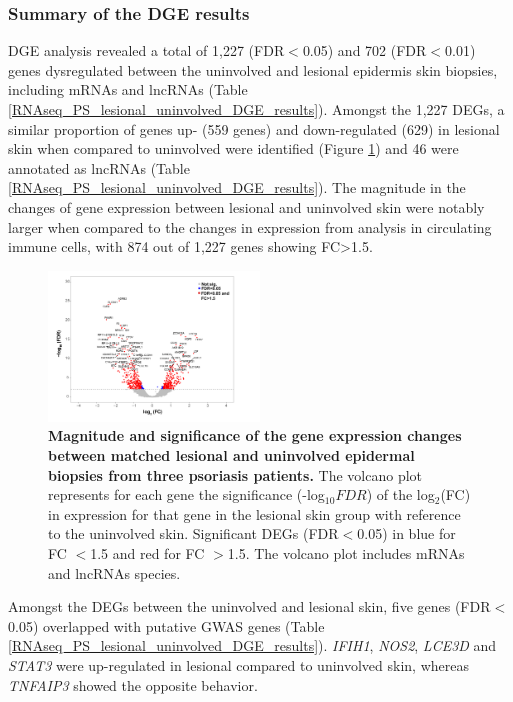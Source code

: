\subsubsection{Summary of the DGE results}

DGE analysis revealed a total of 1,227 (FDR$<$0.05) and 702 (FDR$<$0.01) genes dysregulated between the uninvolved and lesional epidermis skin biopsies, including mRNAs and lncRNAs (Table \ref{RNAseq_PS_lesional_uninvolved_DGE_results}). Amongst the 1,227 DEGs, a similar proportion of genes up- (559 genes) and down-regulated (629) in lesional skin when compared to uninvolved were identified (Figure \ref{figure:Skin_DGE_volcano_plot}) and 46 were annotated as lncRNAs (Table \ref{RNAseq_PS_lesional_uninvolved_DGE_results}). The magnitude in the changes of gene expression between lesional and uninvolved skin were notably larger when compared to the changes in expression from analysis in circulating immune cells, with 874 out of 1,227 genes showing FC>1.5.  



\begin{figure}[htbp]
\centering
\includegraphics[width=0.5\textwidth]{./Results2/pdfs/RNA_PS_lesional_uninvolved_volcano_plot}
\caption[Magnitude and significance of the gene expression changes between matched lesional and uninvolved epidermal biopsies from three psoriasis patients.]{\textbf{Magnitude and significance of the gene expression changes between matched lesional and uninvolved epidermal biopsies from three psoriasis patients.} The volcano plot represents for each gene the significance (-log$_{10}FDR$) of the log$_2$(FC) in expression for that gene in the lesional skin group with reference to the uninvolved skin. Significant DEGs (FDR$<$0.05) in blue for FC $<$1.5 and red for FC $>$1.5. The volcano plot includes mRNAs and lncRNAs species.}
\label{figure:Skin_DGE_volcano_plot}
\end{figure}

Amongst the DEGs between the uninvolved and lesional skin, five genes (FDR$<$0.05) overlapped with putative GWAS genes (Table \ref{RNAseq_PS_lesional_uninvolved_DGE_results}). \textit{IFIH1}, \textit{NOS2}, \textit{LCE3D} and \textit{STAT3} were up-regulated in lesional compared to uninvolved skin, whereas \textit{TNFAIP3} showed the opposite behavior.

